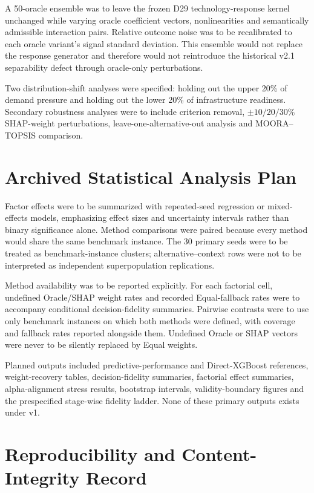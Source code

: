 \documentclass[runningheads,orivec]{llncs}
\begin{document}
A 50-oracle ensemble was to leave the frozen D29 technology-response kernel unchanged while
varying oracle coefficient vectors, nonlinearities and semantically admissible interaction
pairs. Relative outcome noise was to be recalibrated to each oracle variant's signal standard
deviation. This ensemble would not replace the response generator and therefore would not
reintroduce the historical v2.1 separability defect through oracle-only perturbations.

Two distribution-shift analyses were specified: holding out the upper 20\% of demand pressure
and holding out the lower 20\% of infrastructure readiness. Secondary robustness analyses were
to include criterion removal, $\pm10/20/30\%$ SHAP-weight perturbations,
leave-one-alternative-out analysis and MOORA--TOPSIS comparison.

\section{Archived Statistical Analysis Plan}

Factor effects were to be summarized with repeated-seed regression or mixed-effects models,
emphasizing effect sizes and uncertainty intervals rather than binary significance alone.
Method comparisons were paired because every method would share the same benchmark instance.
The 30 primary seeds were to be treated as benchmark-instance clusters; alternative--context
rows were not to be interpreted as independent superpopulation replications.

Method availability was to be reported explicitly. For each factorial cell, undefined
Oracle/SHAP weight rates and recorded Equal-fallback rates were to accompany conditional
decision-fidelity summaries. Pairwise contrasts were to use only benchmark instances on which
both methods were defined, with coverage and fallback rates reported alongside them. Undefined
Oracle or SHAP vectors were never to be silently replaced by Equal weights.

Planned outputs included predictive-performance and Direct-XGBoost references, weight-recovery
tables, decision-fidelity summaries, factorial effect summaries, alpha-alignment stress results,
bootstrap intervals, validity-boundary figures and the prespecified stage-wise fidelity ladder.
None of these primary outputs exists under v1.

\section{Reproducibility and Content-Integrity Record}
\label{supp:sec:integrity}
\end{document}
